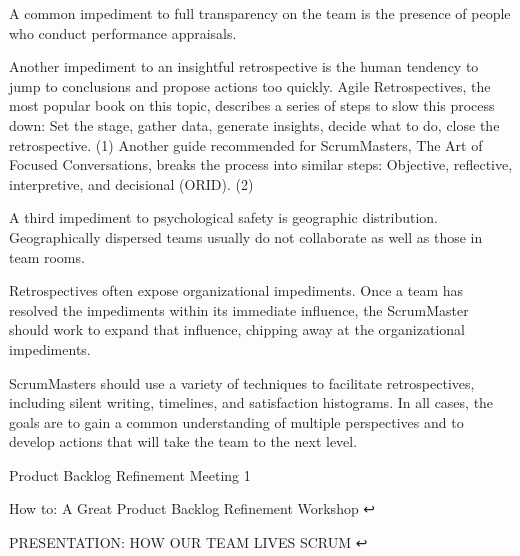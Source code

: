 A common impediment to full transparency on the team is the presence of people who conduct performance appraisals.

Another impediment to an insightful retrospective is the human tendency to jump to conclusions and propose actions too quickly. Agile Retrospectives, the most popular book on this topic, describes a series of steps to slow this process down: Set the stage, gather data, generate insights, decide what to do, close the retrospective. (1) Another guide recommended for ScrumMasters, The Art of Focused Conversations, breaks the process into similar steps: Objective, reflective, interpretive, and decisional (ORID). (2)

A third impediment to psychological safety is geographic distribution. Geographically dispersed teams usually do not collaborate as well as those in team rooms.

Retrospectives often expose organizational impediments. Once a team has resolved the impediments within its immediate influence, the ScrumMaster should work to expand that influence, chipping away at the organizational impediments.

ScrumMasters should use a variety of techniques to facilitate retrospectives, including silent writing, timelines, and satisfaction histograms. In all cases, the goals are to gain a common understanding of multiple perspectives and to develop actions that will take the team to the next level.

Product Backlog Refinement Meeting 1


How to: A Great Product Backlog Refinement Workshop ↩

PRESENTATION: HOW OUR TEAM LIVES SCRUM ↩